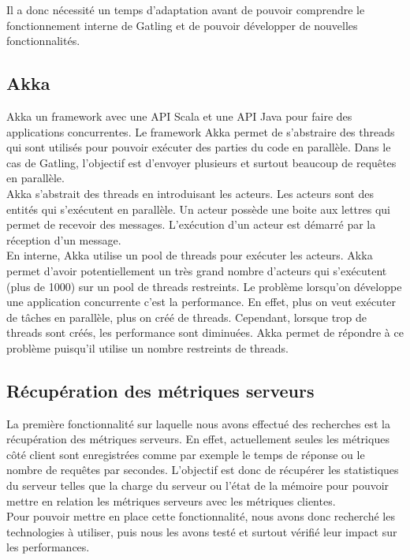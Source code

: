 Il a donc nécessité un temps d'adaptation avant de pouvoir comprendre le fonctionnement interne de Gatling et de pouvoir développer de nouvelles fonctionnalités.

\subsection{Akka}

Akka \cite{akka} un framework avec une API Scala et une API Java pour faire des applications concurrentes. Le framework Akka permet de s'abstraire des threads qui sont utilisés pour pouvoir exécuter des parties du code en parallèle. Dans le cas de Gatling, l'objectif est d'envoyer plusieurs et surtout beaucoup de requêtes en parallèle.\\

Akka s'abstrait des threads en introduisant les acteurs. Les acteurs sont des entités qui s'exécutent en parallèle. Un acteur possède une boite aux lettres qui permet de recevoir des messages. L'exécution d'un acteur est démarré par la réception d'un message.\\

En interne, Akka utilise un pool de threads pour exécuter les acteurs. Akka permet d'avoir potentiellement un très grand nombre d'acteurs qui s'exécutent (plus de 1000) sur un pool de threads restreints. Le problème lorsqu'on développe une application concurrente c'est la performance. En effet, plus on veut exécuter de tâches en parallèle, plus on créé de threads. Cependant, lorsque trop de threads sont créés, les performance sont diminuées. Akka permet de répondre à ce problème puisqu'il utilise un nombre restreints de threads.

\subsection{Récupération des métriques serveurs}

La première fonctionnalité sur laquelle nous avons effectué des recherches est la récupération des métriques serveurs. En effet, actuellement seules les métriques côté client sont enregistrées comme par exemple le temps de réponse ou le nombre de requêtes par secondes. L'objectif est donc de récupérer les statistiques du serveur telles que la charge du serveur ou l'état de la mémoire pour pouvoir mettre en relation les métriques serveurs avec les métriques clientes.\\

Pour pouvoir mettre en place cette fonctionnalité, nous avons donc recherché les technologies à utiliser, puis nous les avons testé et surtout vérifié leur impact sur les performances.\\

